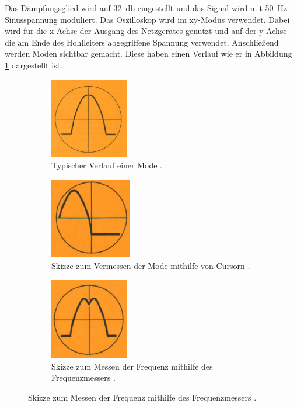 Das Dämpfungsglied wird auf \SI{32}{\decibel} eingestellt und das Signal
wird mit \SI{50}{\hertz} Sinusspannung moduliert. Das Oszilloskop
wird im xy-Modus verwendet. Dabei wird für die x-Achse der Ausgang des Netzgerätes
genutzt und auf der y-Achse die am Ende des Hohlleiters abgegriffene Spannung
verwendet. Anschließend werden Moden sichtbar gemacht. Diese haben einen
Verlauf wie er in Abbildung \ref{fig:mode} dargestellt ist.

\begin{figure}
  \centering
  \begin{subfigure}{0.3\textwidth}
    \centering
    \includegraphics[height=100pt]{data/mode.png}
    \caption{Typischer Verlauf einer Mode \cite{Versuchsanleitung_alt}.}
    \label{fig:mode}
  \end{subfigure}
  \begin{subfigure}{0.3\textwidth}
    \centering
    \includegraphics[height=100pt]{data/seite.png}
    \caption{Skizze zum Vermessen der Mode mithilfe von Cursorn \cite{Versuchsanleitung_alt}.}
    \label{fig:seite}
  \end{subfigure}
  \begin{subfigure}{0.3\textwidth}
    \centering
    \includegraphics[height=100pt]{data/dip.png}
    \caption{Skizze zum Messen der Frequenz mithilfe des Frequenzmessers \cite{Versuchsanleitung_alt}.}
    \label{fig:dip}
  \end{subfigure}
\end{figure}

